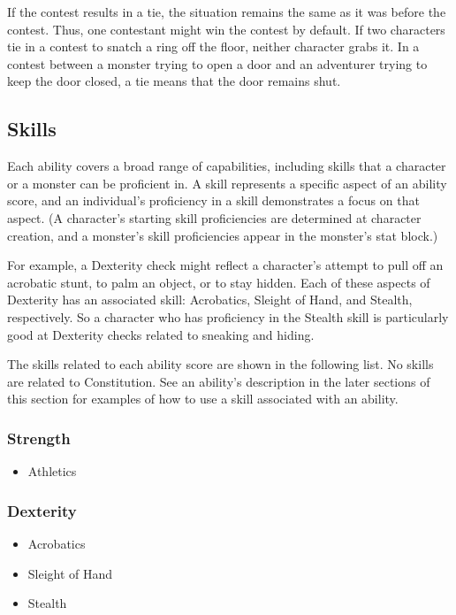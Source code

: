 If the contest results in a tie, the situation remains the same as it was before the contest. Thus, one contestant might win the contest by default. If two characters tie in a contest to snatch a ring off the floor, neither character grabs it. In a contest between a monster trying to open a door and an adventurer trying to keep the door closed, a tie means that the door remains shut.

\subsection{Skills}

Each ability covers a broad range of capabilities, including skills that a character or a monster can be proficient in. A skill represents a specific aspect of an ability score, and an individual's proficiency in a skill demonstrates a focus on that aspect. (A character's starting skill proficiencies are determined at character creation, and a monster's skill proficiencies appear in the monster's stat block.)

For example, a Dexterity check might reflect a character's attempt to pull off an acrobatic stunt, to palm an object, or to stay hidden. Each of these aspects of Dexterity has an associated skill: Acrobatics, Sleight of Hand, and Stealth, respectively. So a character who has proficiency in the Stealth skill is particularly good at Dexterity checks related to sneaking and hiding.

The skills related to each ability score are shown in the following list. No skills are related to Constitution. See an ability's description in the later sections of this section for examples of how to use a skill associated with an ability.

\subsubsection{Strength}

\begin{itemize}
\item Athletics
\end{itemize}

\subsubsection{Dexterity}

\begin{itemize}
\item Acrobatics
\item Sleight of Hand
\item Stealth
\end{itemize}

